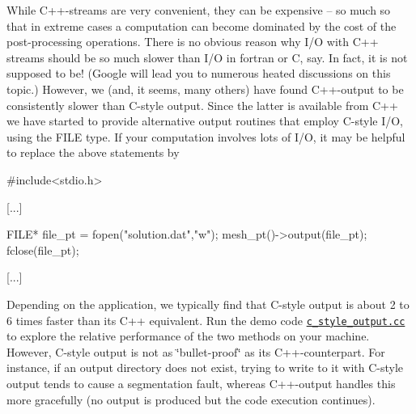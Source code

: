 While C++-\/streams are very convenient, they can be expensive -- so much so that in extreme cases a computation can become dominated by the cost of the post-\/processing operations. There is no obvious reason why I/O with C++ streams should be so much slower than I/O in fortran or C, say. In fact, it is not supposed to be! (Google will lead you to numerous heated discussions on this topic.) However, we (and, it seems, many others) have found C++-\/output to be consistently slower than C-\/style output. Since the latter is available from C++ we have started to provide alternative output routines that employ C-\/style I/O, using the F\+I\+LE type. If your computation involves lots of I/O, it may be helpful to replace the above statements by


\begin{DoxyCode}
\textcolor{preprocessor}{#include<stdio.h>}

[...]

FILE* file\_pt = fopen(\textcolor{stringliteral}{"solution.dat"},\textcolor{stringliteral}{"w"});
mesh\_pt()->output(file\_pt);
fclose(file\_pt);

[...]
\end{DoxyCode}


Depending on the application, we typically find that C-\/style output is about 2 to 6 times faster than its C++ equivalent. Run the demo code \href{../../../demo_drivers/optimisation/C_style_output/c_style_output.cc}{\tt c\+\_\+style\+\_\+output.\+cc} to explore the relative performance of the two methods on your machine. However, C-\/style output is not as \char`\"{}bullet-\/proof\char`\"{} as its C++-\/counterpart. For instance, if an output directory does not exist, trying to write to it with C-\/style output tends to cause a segmentation fault, whereas C++-\/output handles this more gracefully (no output is produced but the code execution continues).



 

